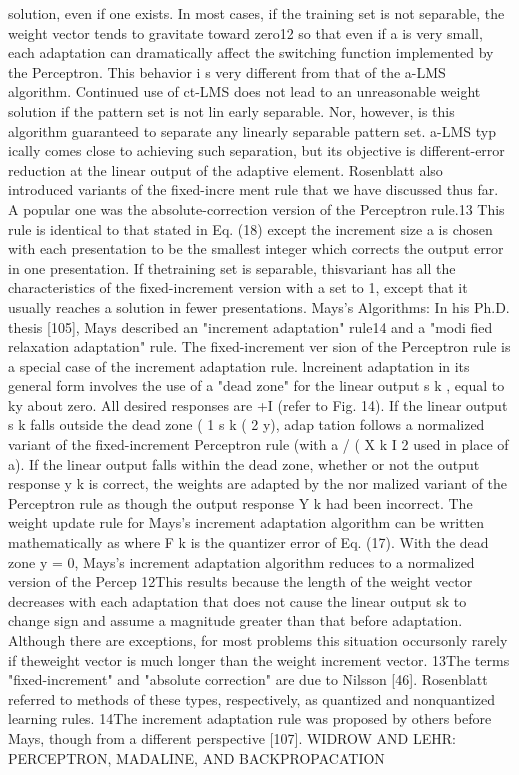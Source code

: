 \documentclass[11pt,a4paper,twocolumn]{article}
\begin{document}
solution, even if one exists. In most cases, if the training set 
is not separable, the weight vector tends to gravitate toward 
zero12 so that even if a is very small, each adaptation can 
dramatically affect the switching function implemented by 
the Perceptron. 
This behavior i s  very different from that of the a-LMS 
algorithm. Continued use of ct-LMS does not lead to an 
unreasonable weight solution if the pattern set is not lin
early separable. Nor, however, is this algorithm guaranteed 
to separate any linearly separable pattern set. a-LMS typ
ically comes close to achieving such separation, but its 
objective is different-error reduction at the linear output 
of the adaptive element. 
Rosenblatt also introduced variants of the fixed-incre
ment rule that we have discussed thus far. A popular one 
was the absolute-correction version of the Perceptron 
rule.13 This rule is identical to that stated in Eq. (18) except 
the increment size a is chosen with each presentation to 
be the smallest integer which corrects the output error in 
one presentation. If thetraining set is separable, thisvariant 
has all the characteristics of the fixed-increment version 
with a set to 1, except that it usually reaches a solution in 
fewer presentations. 
Mays's Algorithms: In his Ph.D. thesis [105], Mays 
described an "increment adaptation" rule14 and a "modi
fied relaxation adaptation" rule. The fixed-increment ver
sion of the Perceptron rule is a special case of the increment 
adaptation rule. 
lncreinent adaptation in its general form involves the use 
of a "dead zone" for the linear output s k ,  equal to ky about 
zero. All desired responses are +I (refer to Fig. 14). If the 
linear output s k  falls outside the dead zone ( 1 s k (  2 y), adap
tation follows a normalized variant of the fixed-increment 
Perceptron rule (with a / ( X k I 2  used in place of a). If the linear 
output falls within the dead zone, whether or not the output 
response y k  is correct, the weights are adapted by the nor
malized variant of the Perceptron rule as though the output 
response Y k  had been incorrect. The weight update rule for 
Mays's increment adaptation algorithm can be written 
mathematically as 
where F k  is the quantizer error of Eq. (17). 
With the dead zone y = 0, Mays's increment adaptation 
algorithm reduces to a normalized version of the Percep
12This results because the length of the weight vector decreases 
with each adaptation that does not cause the linear output sk to 
change sign and assume a magnitude greater than that before 
adaptation. Although there are exceptions, for most problems this 
situation occursonly rarely if theweight vector is much longer than 
the weight increment vector. 
13The terms "fixed-increment" and "absolute correction" are due 
to Nilsson [46]. Rosenblatt referred to methods of these types, 
respectively, as quantized and nonquantized learning rules. 
14The increment adaptation rule was proposed by others before 
Mays, though from a different perspective [107]. 
WIDROW AND LEHR: PERCEPTRON, MADALINE, AND BACKPROPACATION 
\end{document}
